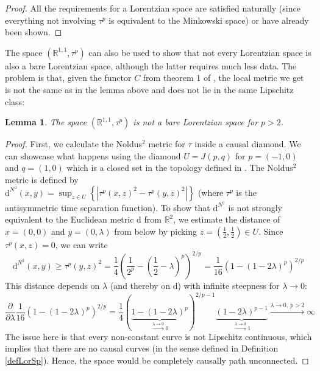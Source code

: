 \documentclass[11pt, a4paper]{article} %
\newcommand{\R}{\mathbb{R}} %
\newcommand{\dd}{\text{d}} %
\newtheorem{lemma}[definition]{Lemma}
\theoremstyle{plain} %
\begin{document}
\begin{proof}
     All the requirements for a Lorentzian space are satisfied naturally (since everything not involving $\tau^p$ is equivalent to the Minkowski space) or have already been shown.
\end{proof}
The space $(\R^{1,1},\tau^p)$ can also be used to show that not every Lorentzian space is also a bare Lorentzian space, although the latter requires much less data. The problem is that, given the functor $C$ from theorem 1 of \cite{muller2024maximality}, the local metric we get is not the same as in the lemma above and does not lie in the same Lipschitz class:
\begin{lemma}
    The space $(\R^{1,1},\tau^p)$ is not a bare Lorentzian space for $p>2$.
\end{lemma}
\begin{proof}
    First, we calculate the Noldus$^2$ metric for $\tau$ inside a causal diamond. We can showcase what happens using the diamond $U=J(p,q)$ for $p=(-1,0)$ and $q=(1,0)$ which is a closed set in the topology defined in \cite{muller2024maximality}.
    The Noldus$^2$ metric is defined by\\
    $\dd^{N^2}(x,y) = \sup_{z\in U} \left\{ |\tau^p(x,z)^2 - \tau^p(y,z)^2| \right\}$ (where $\tau^p$ is the antisymmetric time separation function).
    To show that $\dd^{N^2}$ is not strongly equivalent to the Euclidean metric $\dd$ from $\R^2$, we estimate the distance of $x=(0,0)$ and $y=(0,\lambda)$ from below by picking $z = (\frac{1}{2},\frac{1}{2})\in U$. Since $\tau^p(x,z)=0$, we can write
    \begin{equation*}
            \dd^{N^2} (x,y) \geq \tau^p(y,z)^2 = \frac{1}{4} \left( \frac{1}{2^p} - \left(\frac{1}{2} - \lambda\right)^p\right)^{2/p} = \frac{1}{16}\left( 1 - (1 - 2\lambda)^{p} \right)^{2/p}
    \end{equation*}
    This distance depends on $\lambda$ (and thereby on $\dd$) with infinite steepness for $\lambda\to 0$:
    $$\frac{\partial}{\partial \lambda} \frac{1}{16}\left( 1 - (1 - 2\lambda)^{p} \right)^{2/p} = \frac{1}{4} \left(\underbrace{1-(1-2 \lambda)^p}_{\xrightarrow{\lambda \to 0} 0}\right)^{2/p-1}\underbrace{(1-2 \lambda)^{p-1}}_{\xrightarrow{\lambda \to 0} 1}  \xrightarrow{\lambda \to 0, \ p>2} \infty $$
    The issue here is that every non-constant curve is not Lipschitz continuous, which implies that there are no causal curves (in the sense defined in Definition \ref{defLorSp}). Hence, the space would be completely causally path unconnected. 
\end{proof}
\end{document}
